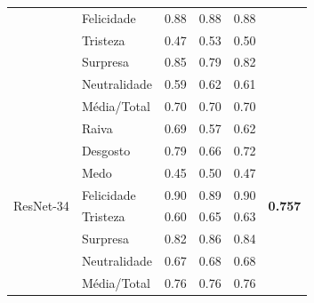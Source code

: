 \documentclass{beamer}
\begin{document}
\begin{frame}
\begin{table}[]
\begin{tabular}{llcccc}
                                    & Felicidade            & 0.88              & 0.88               & 0.88              &                                 \\
                                    & Tristeza              & 0.47              & 0.53               & 0.50              &                                 \\
                                    & Surpresa              & 0.85              & 0.79               & 0.82              &                                 \\
                                    & Neutralidade          & 0.59              & 0.62               & 0.61              &                                 \\
                                    & Média/Total           & 0.70              & 0.70               & 0.70              &                                 \\ \hline
\multirow{8}{*}{ResNet-34} & Raiva        & 0.69     & 0.57      & 0.62     & \multirow{8}{*}{\scriptsize \textbf{0.757}} \\
                                    & Desgosto     & 0.79     & 0.66      & 0.72     &                                 \\
                                    & Medo         & 0.45     & 0.50      & 0.47     &                                 \\
                                    & Felicidade   & 0.90     & 0.89      & 0.90     &                                 \\
                                    & Tristeza     & 0.60     & 0.65      & 0.63     &                                 \\
                                    & Surpresa     & 0.82     & 0.86      & 0.84     &                                 \\
                                    & Neutralidade & 0.67     & 0.68      & 0.68     &                                 \\
                                    & Média/Total  & 0.76     & 0.76      & 0.76     &                                 \\ \hline
\end{tabular}
\end{table} 
\end{frame}
\end{document}
